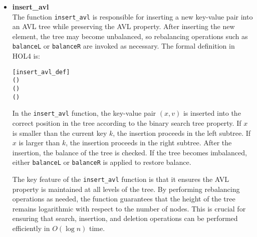 \documentclass[12pt]{article}
\begin{document}
\begin{itemize}
  The logic for \texttt{balanceR} is analogous to \texttt{balanceL}, but it handles the case where the right subtree is imbalanced. Similar to \texttt{balanceL}, this function performs either a single or double rotation depending on the structure of the right subtree. Rebalancing the right subtree is essential for maintaining the AVL property after an insertion into the right child of the tree.

  \item \textbf{insert\_avl} \\
  The function \texttt{insert\_avl} is responsible for inserting a new key-value pair into an AVL tree while preserving the AVL property. After inserting the new element, the tree may become unbalanced, so rebalancing operations such as \texttt{balanceL} or \texttt{balanceR} are invoked as necessary. The formal definition in HOL4 is:

\begin{alltt}
[insert_avl_def]
    \HOLTokenDefEquality{}   
   (     ) \HOLTokenDefEquality{}
    \HOLSymConst{=}        
     \HOLSymConst{\HOLTokenLt{}}      (   ) 
       (   )
\end{alltt}

  In the \texttt{insert\_avl} function, the key-value pair \( (x, v) \) is inserted into the correct position in the tree according to the binary search tree property. If \( x \) is smaller than the current key \( k \), the insertion proceeds in the left subtree. If \( x \) is larger than \( k \), the insertion proceeds in the right subtree. After the insertion, the balance of the tree is checked. If the tree becomes imbalanced, either \texttt{balanceL} or \texttt{balanceR} is applied to restore balance.

  The key feature of the \texttt{insert\_avl} function is that it ensures the AVL property is maintained at all levels of the tree. By performing rebalancing operations as needed, the function guarantees that the height of the tree remains logarithmic with respect to the number of nodes. This is crucial for ensuring that search, insertion, and deletion operations can be performed efficiently in \( O(\log n) \) time.

\end{itemize}
\end{document}
